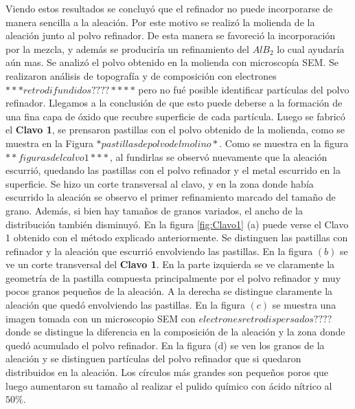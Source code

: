 \documentclass[a4paper,12pt,fleqn,twoside,openany]{book}
\begin{document}
Viendo estos resultados se concluyó que el refinador no puede incorporarse de manera sencilla a la aleación. Por este motivo se realizó la molienda de la aleación junto al polvo refinador. De esta manera se favoreció la incorporación por la mezcla, y además se produciría un refinamiento del $AlB_2$ lo cual ayudaría aún mas. Se analizó el polvo obtenido en la molienda con microscopía SEM. Se realizaron análisis de topografía y de composición con electrones $***retrodifundidos????****$ pero no fué posible identificar partículas del polvo refinador. Llegamos a la conclusión de que esto puede deberse a la formación de una fina capa de óxido que recubre superficie de cada partícula. Luego se fabricó el \textbf{Clavo 1}, se prensaron pastillas con el polvo obtenido de la molienda, como se muestra en la Figura $*pastillas de polvo del molino*$. Como se muestra en la figura $** figuras del calvo 1 ***$, al fundirlas se observó nuevamente que la aleación escurrió, quedando las pastillas con el polvo refinador y el metal escurrido en la superficie. Se hizo un corte transversal al clavo, y en la zona donde había escurrido la aleación se observo el primer refinamiento marcado del tamaño de grano. Además, si bien hay tamaños de granos variados, el ancho de la distribución también disminuyó. En la figura \ref{fig:Clavo1} (a) puede verse el Clavo 1 obtenido con el método explicado anteriormente. Se distinguen las pastillas con refinador y la aleación que escurrió envolviendo las pastillas. En la figura $(b)$ se ve un corte transversal del \textbf{Clavo 1}. En la parte izquierda se ve claramente la geometría de la pastilla compuesta principalmente por el polvo refinador y muy pocos granos pequeños de la aleación. A la derecha se distingue claramente la aleación que quedó envolviendo las pastillas. En la figura $(c)$ se muestra una imagen tomada con un microscopio SEM con $electrones retrodispersados????$ donde se distingue la diferencia en la composición de la aleación y la zona donde quedó acumulado el polvo refinador. En la figura (d) se ven los granos de la aleación y se distinguen partículas del polvo refinador que si quedaron distribuidos en la aleación. Los círculos más grandes son pequeños poros que luego aumentaron su tamaño al realizar el pulido químico con ácido nítrico al $50 \%$.
\end{document}
